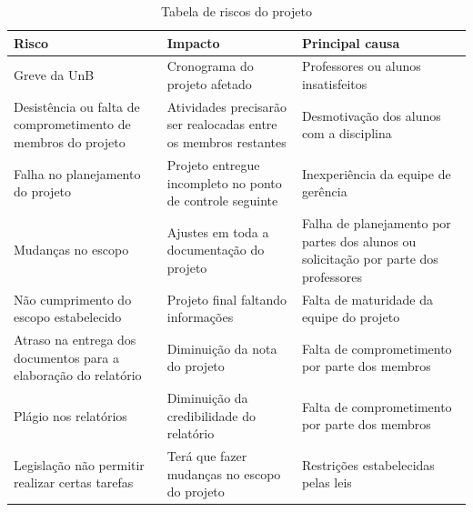   \begin{table}[!htb]
    \centering
    \begin{tabular}{p{5cm}p{5cm}p{5cm}}
      \toprule
        \textbf{Risco} & \textbf{Impacto} & \textbf{Principal causa} \\
      \midrule
        Greve da UnB                                                    & Cronograma do projeto afetado                                   & Professores ou alunos insatisfeitos                                                   \\ \midrule
        Desistência ou falta de comprometimento de membros do projeto   & Atividades precisarão ser realocadas entre os membros restantes & Desmotivação dos alunos com a disciplina                                              \\ \midrule
        Falha no planejamento do projeto                                & Projeto entregue incompleto no ponto de controle seguinte       & Inexperiência da equipe de gerência                                                   \\ \midrule
        Mudanças no escopo                                              & Ajustes em toda a documentação do projeto                       & Falha de planejamento por partes dos alunos ou solicitação por parte dos professores  \\ \midrule
        Não cumprimento do escopo estabelecido                          & Projeto final faltando informações                              & Falta de maturidade da equipe do projeto                                              \\ \midrule
        Atraso na entrega dos documentos para a elaboração do relatório & Diminuição da nota do projeto                                   & Falta de comprometimento por parte dos membros                                        \\ \midrule
        Plágio nos relatórios                                           & Diminuição da credibilidade do relatório                        & Falta de comprometimento por parte dos membros                                        \\ \midrule
        Legislação não permitir realizar certas tarefas                 & Terá que fazer mudanças no escopo do projeto                    & Restrições estabelecidas pelas leis                                                   \\
      \bottomrule
    \end{tabular}
    \caption{Tabela de riscos do projeto}
  \end{table}

